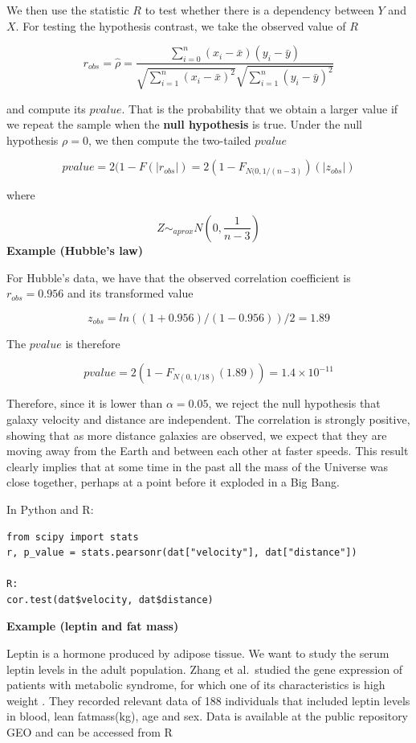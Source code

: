 \documentclass[
]{book}
\begin{document}
We then use the statistic \(R\) to test whether there is a dependency between \(Y\) and \(X\). For testing the hypothesis contrast, we take the observed value of \(R\)

\[r_{obs}=\hat{\rho}=\frac{\sum_{i=0}^n(x_i-\bar{x})(y_i-\bar{y})}{\sqrt{\sum_{i=1}^n(x_i-\bar{x})^2}\sqrt{\sum_{i=1}^n(y_i-\bar{y})^2}}\]

and compute its \(pvalue\). That is the probability that we obtain a larger value if we repeat the sample when the \textbf{null hypothesis} is true. Under the null hypothesis \(\rho=0\), we then compute the two-tailed \(pvalue\)

\[pvalue=2(1- F(|r_{obs}|)= 2(1- F_{N(0, 1/(n-3
)})(|z_{obs}|)  \]

where

\[Z \sim_{aprox} N(0, \frac{1}{n-3})\]
\textbf{Example (Hubble's law)}

For Hubble's data, we have that the observed correlation coefficient is \(r_{obs}=0.956\) and its transformed value

\[z_{obs}=ln((1+0.956)/(1-0.956))/2=1.89\]

The \(pvalue\) is therefore

\[pvalue=2(1- F_{N(0,1/18)}(1.89))=1.4\times 10^{-11}\]

Therefore, since it is lower than \(\alpha=0.05\), we reject the null hypothesis that galaxy velocity and distance are independent. The correlation is strongly positive, showing that as more distance galaxies are observed, we expect that they are moving away from the Earth and between each other at faster speeds. This result clearly implies that at some time in the past all the mass of the Universe was close together, perhaps at a point before it exploded in a Big Bang.

In Python and R:

\begin{verbatim}
from scipy import stats
r, p_value = stats.pearsonr(dat["velocity"], dat["distance"])

R:
cor.test(dat$velocity, dat$distance)
\end{verbatim}

\textbf{Example (leptin and fat mass)}

Leptin is a hormone produced by adipose tissue. We want to study the serum leptin levels in the adult population. Zhang et al.~studied the gene expression of patients with metabolic syndrome, for which one of its characteristics is high weight \citep{Zhang2013_adiponectinQTLs}. They recorded relevant data of 188 individuals that included leptin levels in blood, lean fatmass(kg), age and sex. Data is available at the public repository GEO and can be accessed from R
\end{document}

